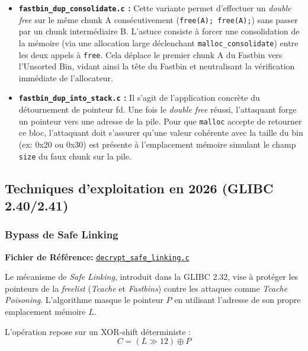 \begin{itemize}
    \item \textbf{\texttt{fastbin\_dup\_consolidate.c} :} Cette variante permet d'effectuer un \textit{double free} sur le même chunk A consécutivement (\texttt{free(A); free(A);}) sans passer par un chunk intermédiaire B. L'astuce consiste à forcer une consolidation de la mémoire (via une allocation large déclenchant \texttt{malloc\_consolidate}) entre les deux appels à \texttt{free}. Cela déplace le premier chunk A du Fastbin vers l'Unsorted Bin, vidant ainsi la tête du Fastbin et neutralisant la vérification immédiate de l'allocateur.
    \item \textbf{\texttt{fastbin\_dup\_into\_stack.c} :} Il s'agit de l'application concrète du détournement de pointeur fd. Une fois le \textit{double free} réussi, l'attaquant forge un pointeur vers une adresse de la pile. Pour que \texttt{malloc} accepte de retourner ce bloc, l'attaquant doit s'assurer qu'une valeur cohérente avec la taille du bin (ex: 0x20 ou 0x30) est présente à l'emplacement mémoire simulant le champ \texttt{size} du faux chunk sur la pile.
\end{itemize}

\subsection{Techniques d'exploitation en 2026 (GLIBC 2.40/2.41)}

\subsubsection{Bypass de Safe Linking}

\noindent\textbf{Fichier de Référence:} \href{https://github.com/shellphish/how2heap/blob/master/glibc_2.41/decrypt_safe_linking.c}{\texttt{decrypt\_safe\_linking.c}}

Le mécanisme de \textit{Safe Linking}, introduit dans la GLIBC 2.32, vise à protéger les pointeurs de la \textit{freelist} (\textit{Tcache} et \textit{Fastbins}) contre les attaques comme \textit{Tcache Poisoning}. L'algorithme masque le pointeur $P$ en utilisant l'adresse de son propre emplacement mémoire $L$.

L'opération repose sur un XOR-shift déterministe :
$$C = (L \gg 12) \oplus P$$


